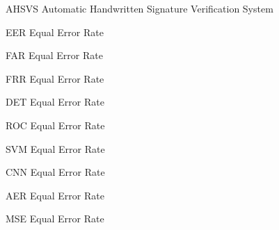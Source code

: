 \begin{siglas}
	
\item[AHSVS] Automatic Handwritten Signature Verification System
\item[EER] Equal Error Rate
\item[FAR] Equal Error Rate
\item[FRR] Equal Error Rate
\item[DET] Equal Error Rate
\item[ROC] Equal Error Rate
\item[SVM] Equal Error Rate
\item[CNN] Equal Error Rate
\item[AER] Equal Error Rate
\item[MSE] Equal Error Rate
\end{siglas}
